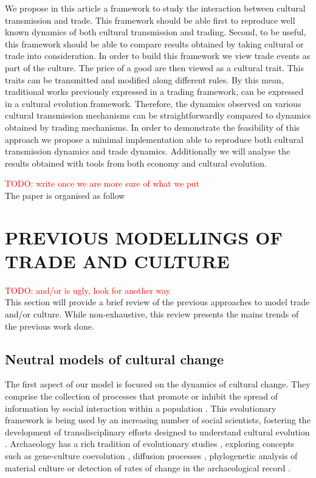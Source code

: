 \documentclass{wscpaperproc}
\newcommand{\memo}[2]{\textcolor{#1}{#2}}
\newcommand{\todo}[1]{\memo{red}{TODO: #1\\}}
\begin{document}
We propose in this article a framework to study the interaction between cultural transmission and trade. This framework should be able first to reproduce well known dynamics of both cultural transmission and trading. Second, to be useful, this framework should be able to compare results obtained by taking cultural or trade into consideration. In order to build this framework we view trade events as part of the culture. The price of a good are then viewed as a cultural trait. This traits can be transmitted and modified along different rules. By this mean, traditional works previously expressed in a trading framework, can be expressed in a cultural evolution framework. Therefore, the dynamics observed on various cultural transmission mechanisms can be straightforwardly compared to dynamics obtained by trading mechanisms. In order to demonstrate the feasibility of this approach we propose a minimal implementation able to reproduce both cultural transmission dynamics and trade dynamics. Additionally we will analyse the results obtained with tools from both economy and cultural evolution.




\todo{write once we are more sure of what we put}
The paper is organised as follow

\section{PREVIOUS MODELLINGS OF TRADE AND CULTURE}

\todo{and/or is ugly, look for another way}
This section will provide a brief review of the previous approaches to model trade and/or culture. While non-exhaustive, this review presents the mains trends of the previous work done.

\subsection{Neutral models of cultural change}

The first aspect of our model is focused on the dynamics of cultural change. They comprise the collection of processes that promote or inhibit the spread of information by social interaction within a population \cite[3]{boyd_origin_2005}. This evolutionary framework is being used by an increasing number of social scientists, fostering the development of transdisciplinary efforts designed to understand cultural evolution \cite{henrich_evolution_2003}. Archaeology has a rich tradition of evolutionary studies \cite{lycett_cultural_2015}, exploring concepts such as gene-culture coevolution \cite{burger_absence_2007}, diffusion processes \cite{fort_synthesis_2012}, phylogenetic analysis of material culture \cite{obrien_cladistics_2001} or detection of rates of change in the archaeological record \cite{premo_cultural_2014}.
\end{document}
